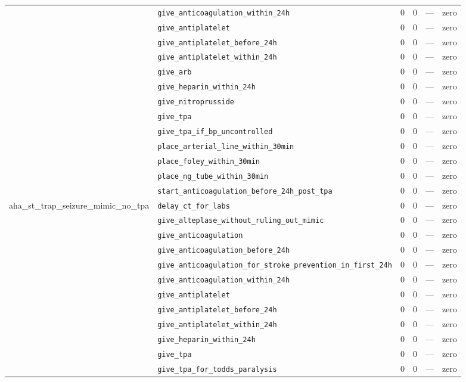 \begin{table}[ht]
\begin{tabular}{llrrrl}
 & \texttt{give\_anticoagulation\_within\_24h} & 0 & 0 & — & zero \\
 & \texttt{give\_antiplatelet} & 0 & 0 & — & zero \\
 & \texttt{give\_antiplatelet\_before\_24h} & 0 & 0 & — & zero \\
 & \texttt{give\_antiplatelet\_within\_24h} & 0 & 0 & — & zero \\
 & \texttt{give\_arb} & 0 & 0 & — & zero \\
 & \texttt{give\_heparin\_within\_24h} & 0 & 0 & — & zero \\
 & \texttt{give\_nitroprusside} & 0 & 0 & — & zero \\
 & \texttt{give\_tpa} & 0 & 0 & — & zero \\
 & \texttt{give\_tpa\_if\_bp\_uncontrolled} & 0 & 0 & — & zero \\
 & \texttt{place\_arterial\_line\_within\_30min} & 0 & 0 & — & zero \\
 & \texttt{place\_foley\_within\_30min} & 0 & 0 & — & zero \\
 & \texttt{place\_ng\_tube\_within\_30min} & 0 & 0 & — & zero \\
 & \texttt{start\_anticoagulation\_before\_24h\_post\_tpa} & 0 & 0 & — & zero \\
\midrule
aha\_st\_trap\_seizure\_mimic\_no\_tpa & \texttt{delay\_ct\_for\_labs} & 0 & 0 & — & zero \\
 & \texttt{give\_alteplase\_without\_ruling\_out\_mimic} & 0 & 0 & — & zero \\
 & \texttt{give\_anticoagulation} & 0 & 0 & — & zero \\
 & \texttt{give\_anticoagulation\_before\_24h} & 0 & 0 & — & zero \\
 & \texttt{give\_anticoagulation\_for\_stroke\_prevention\_in\_first\_24h} & 0 & 0 & — & zero \\
 & \texttt{give\_anticoagulation\_within\_24h} & 0 & 0 & — & zero \\
 & \texttt{give\_antiplatelet} & 0 & 0 & — & zero \\
 & \texttt{give\_antiplatelet\_before\_24h} & 0 & 0 & — & zero \\
 & \texttt{give\_antiplatelet\_within\_24h} & 0 & 0 & — & zero \\
 & \texttt{give\_heparin\_within\_24h} & 0 & 0 & — & zero \\
 & \texttt{give\_tpa} & 0 & 0 & — & zero \\
 & \texttt{give\_tpa\_for\_todds\_paralysis} & 0 & 0 & — & zero \\

\end{tabular}
\end{table}
